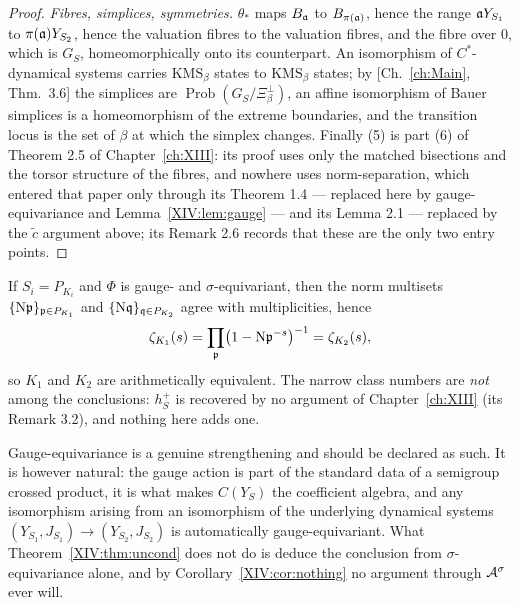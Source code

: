 \begin{proof}
\emph{Fibres, simplices, symmetries.} $\theta_*$ maps $B_{\mathfrak{a}}$ to $B_{\pi(\mathfrak{a})}$, hence
the range $\mathfrak{a} Y_{S_1}$ to $\pi(\mathfrak{a})Y_{S_2}$, hence the valuation fibres to the
valuation fibres, and the fibre over $0$, which is $G_S$, homeomorphically onto its
counterpart. An isomorphism of $C^*$-dynamical systems carries $\mathrm{KMS}_\beta$ states
to $\mathrm{KMS}_\beta$ states; by [Ch.~\ref{ch:Main}, Thm.~3.6] the simplices are
$\operatorname{Prob}(G_S/\Xi_\beta^\perp)$, an affine isomorphism of Bauer simplices is a
homeomorphism of the extreme boundaries, and the transition locus is the set of $\beta$ at
which the simplex changes. Finally (5) is part (6) of Theorem 2.5 of Chapter~\ref{ch:XIII}: its proof
uses only the matched bisections and the torsor structure of the fibres, and nowhere uses
norm-separation, which entered that paper only through its Theorem 1.4 --- replaced here by
gauge-equivariance and Lemma~\ref{XIV:lem:gauge} --- and its Lemma 2.1 --- replaced by the
$\widetilde c$ argument above; its Remark 2.6 records that these are the only two entry
points.
\end{proof}

\begin{corollary}\label{XIV:cor:zeta}
If $S_i=P_{K_i}$ and $\Phi$ is gauge- and $\sigma$-equivariant, then the norm multisets
$\{\mathrm{N}\mathfrak{p}\}_{\mathfrak{p}\in P_{K_1}}$ and $\{\mathrm{N}\mathfrak{q}\}_{\mathfrak{q}\in P_{K_2}}$ agree with multiplicities,
hence
\[
\zeta_{K_1}(s)=\prod_{\mathfrak{p}}\bigl(1-\mathrm{N}\mathfrak{p}^{-s}\bigr)^{-1}=\zeta_{K_2}(s),
\]
so $K_1$ and $K_2$ are arithmetically equivalent. The narrow class numbers are \emph{not}
among the conclusions: $h^+_S$ is recovered by no argument of Chapter~\ref{ch:XIII} (its Remark 3.2),
and nothing here adds one.
\end{corollary}

\begin{remark}\label{XIV:rem:reasonable}
Gauge-equivariance is a genuine strengthening and should be declared as such. It is however
natural: the gauge action is part of the standard data of a semigroup crossed product, it is
what makes $C(Y_S)$ the coefficient algebra, and any isomorphism arising from an isomorphism
of the underlying dynamical systems $(Y_{S_1},J_{S_1})\to(Y_{S_2},J_{S_2})$ is automatically
gauge-equivariant. What Theorem~\ref{XIV:thm:uncond} does not do is deduce the conclusion from
$\sigma$-equivariance alone, and by Corollary~\ref{XIV:cor:nothing} no argument through
$\mathcal{A}^\sigma$ ever will.
\end{remark}

